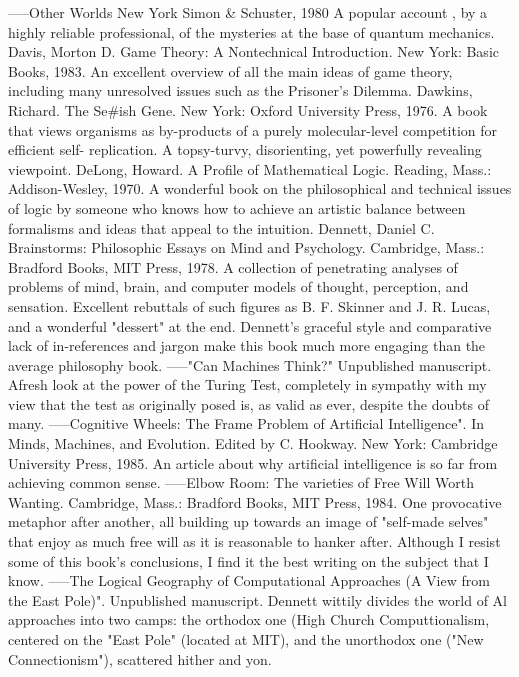 -----Other Worlds New York Simon \& Schuster, 1980 A popular account , by a highly
  reliable professional, of the mysteries at the base of quantum mechanics.
Davis, Morton D. Game Theory: A Nontechnical Introduction. New York: Basic Books,
  1983. An excellent overview of all the main ideas of game theory, including many
  unresolved issues such as the Prisoner's Dilemma.
Dawkins, Richard. The Se\#ish Gene. New York: Oxford University Press, 1976. A book that
  views organisms as by-products of a purely molecular-level competition for efficient self-
  replication. A topsy-turvy, disorienting, yet powerfully revealing viewpoint.
DeLong, Howard. A Profile of Mathematical Logic. Reading, Mass.: Addison-Wesley, 1970.
  A wonderful book on the philosophical and technical issues of logic by someone who
  knows how to achieve an artistic balance between formalisms and ideas that appeal to the
  intuition.
Dennett, Daniel C. Brainstorms: Philosophic Essays on Mind and Psychology. Cambridge,
  Mass.: Bradford Books, MIT Press, 1978. A collection of penetrating analyses of problems
  of mind, brain, and computer models of thought, perception, and sensation. Excellent
  rebuttals of such figures as B. F. Skinner and J. R. Lucas, and a wonderful "dessert" at the
  end. Dennett's graceful style and comparative lack of in-references and jargon make this
  book much more engaging than the average philosophy book.
-----"Can Machines Think?" Unpublished manuscript. Afresh look at the power of the Turing
  Test, completely in sympathy with my view that the test as originally posed is, as valid as
  ever, despite the doubts of many.
-----Cognitive Wheels: The Frame Problem of Artificial Intelligence". In Minds, Machines,
  and Evolution. Edited by C. Hookway. New York: Cambridge University Press, 1985. An
  article about why artificial intelligence is so far from achieving common sense.
-----Elbow Room: The varieties of Free Will Worth Wanting. Cambridge, Mass.: Bradford
  Books, MIT Press, 1984. One provocative metaphor after another, all building up towards
  an image of "self-made selves" that enjoy as much free will as it is reasonable to hanker
  after. Although I resist some of this book's conclusions, I find it the best writing on the
  subject that I know.
-----The Logical Geography of Computational Approaches (A View from the East Pole)".
  Unpublished manuscript. Dennett wittily divides the world of Al approaches into two
  camps: the orthodox one (High Church Computtionalism, centered on the "East Pole"
  (located at MIT), and the unorthodox one ("New Connectionism"), scattered hither and yon.
